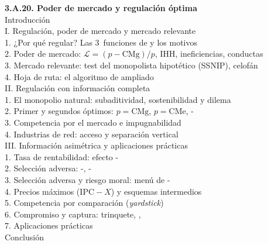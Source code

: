 \documentclass[11pt]{article}
\begin{document}
\begin{esquema}
\textbf{3.A.20. Poder de mercado y regulación óptima}\\[2pt]
Introducción\\
I. Regulación, poder de mercado y mercado relevante\\
\hspace*{1.5em}1. ¿Por qué regular? Las 3~funciones de  y los motivos\\
\hspace*{1.5em}2. Poder de mercado: $\mathcal{L}=(p-\mathrm{CMg})/p$, IHH, ineficiencias, conductas\\
\hspace*{1.5em}3. Mercado relevante: test del monopolista hipotético (SSNIP), celofán\\
\hspace*{1.5em}4. Hoja de ruta: el algoritmo de  ampliado\\
II. Regulación con información completa\\
\hspace*{1.5em}1. El monopolio natural: subaditividad, sostenibilidad y dilema\\
\hspace*{1.5em}2. Primer y segundos óptimos: $p=\mathrm{CMg}$, $p=\mathrm{CMe}$, -\\
\hspace*{1.5em}3. Competencia por el mercado e impugnabilidad\\
\hspace*{1.5em}4. Industrias de red: acceso y separación vertical\\
III. Información asimétrica y aplicaciones prácticas\\
\hspace*{1.5em}1. Tasa de rentabilidad: efecto -\\
\hspace*{1.5em}2. Selección adversa: -, -\\
\hspace*{1.5em}3. Selección adversa y riesgo moral: menú de -\\
\hspace*{1.5em}4. Precios máximos ($\mathrm{IPC}-X$) y esquemas intermedios\\
\hspace*{1.5em}5. Competencia por comparación (\emph{yardstick})\\
\hspace*{1.5em}6. Compromiso y captura: trinquete, , \\
\hspace*{1.5em}7. Aplicaciones prácticas\\
Conclusión
\end{esquema}
\end{document}
